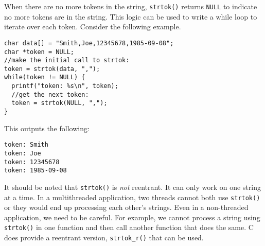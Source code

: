 When there are no more tokens in the string, 
\texttt{strtok()} returns \texttt{NULL} 
to indicate no more tokens are in the string.  This
logic can be used to write a while loop to iterate
over each token.  Consider the following example.

\begin{verbatim}
char data[] = "Smith,Joe,12345678,1985-09-08";
char *token = NULL;
//make the initial call to strtok:
token = strtok(data, ",");
while(token != NULL) {
  printf("token: %s\n", token);
  //get the next token:
  token = strtok(NULL, ",");
}
\end{verbatim}

This outputs the following:

\begin{verbatim}
token: Smith
token: Joe
token: 12345678
token: 1985-09-08
\end{verbatim}


It should be noted that \texttt{strtok()} is
\emph{not}  \gls{reentrant}.  It can only work on 
one string at a time.  In a multithreaded application, 
two threads cannot both use \texttt{strtok()}
or they would end up processing each other's strings.
Even in a non-threaded application, we need to be
careful.  For example, we cannot process a string using
\texttt{strtok()} in one function and then call
another function that does the same.  C does provide
a reentrant version, \texttt{strtok_r()} that
can be used.


